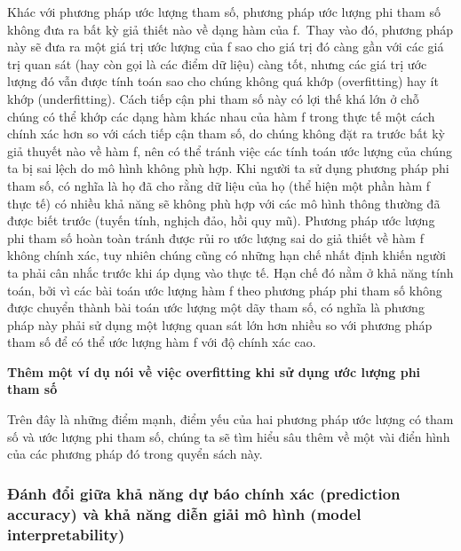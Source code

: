 \documentclass[
]{article}
\begin{document}
Khác với phương pháp ước lượng tham số, phương pháp ước lượng phi tham số không đưa ra bất kỳ giả thiết nào về dạng hàm của f.~Thay vào đó, phương pháp này sẽ đưa ra một giá trị ước lượng của f sao cho giá trị đó càng gần với các giá trị quan sát (hay còn gọi là các điểm dữ liệu) càng tốt, nhưng các giá trị ước lượng đó vẫn được tính toán sao cho chúng không quá khớp (overfitting) hay ít khớp (underfitting). Cách tiếp cận phi tham số này có lợi thế khá lớn ở chỗ chúng có thể khớp các dạng hàm khác nhau của hàm f trong thực tế một cách chính xác hơn so với cách tiếp cận tham số, do chúng không đặt ra trước bất kỳ giả thuyết nào về hàm f, nên có thể tránh việc các tính toán ước lượng của chúng ta bị sai lệch do mô hình không phù hợp. Khi người ta sử dụng phương pháp phi tham số, có nghĩa là họ đã cho rằng dữ liệu của họ (thể hiện một phần hàm f thực tế) có nhiều khả năng sẽ không phù hợp với các mô hình thông thường đã được biết trước (tuyến tính, nghịch đảo, hồi quy mũ). Phương pháp ước lượng phi tham số hoàn toàn tránh được rủi ro ước lượng sai do giả thiết về hàm f không chính xác, tuy nhiên chúng cũng có những hạn chế nhất định khiến người ta phải cân nhắc trước khi áp dụng vào thực tế. Hạn chế đó nằm ở khả năng tính toán, bởi vì các bài toán ước lượng hàm f theo phương pháp phi tham số không được chuyển thành bài toán ước lượng một dãy tham số, có nghĩa là phương pháp này phải sử dụng một lượng quan sát lớn hơn nhiều so với phương pháp tham số để có thể ước lượng hàm f với độ chính xác cao.

\textbf{Thêm một ví dụ nói về việc overfitting khi sử dụng ước lượng phi tham số}

Trên đây là những điểm mạnh, điểm yếu của hai phương pháp ước lượng có tham số và ước lượng phi tham số, chúng ta sẽ tìm hiểu sâu thêm về một vài điển hình của các phương pháp đó trong quyển sách này.

\hypertarget{ux111uxe1nh-ux111ux1ed5i-giux1eefa-khux1ea3-nux103ng-dux1ef1-buxe1o-chuxednh-xuxe1c-prediction-accuracy-vuxe0-khux1ea3-nux103ng-diux1ec5n-giux1ea3i-muxf4-huxecnh-model-interpretability}{%
\subsubsection{Đánh đổi giữa khả năng dự báo chính xác (prediction accuracy) và khả năng diễn giải mô hình (model interpretability)}\label{ux111uxe1nh-ux111ux1ed5i-giux1eefa-khux1ea3-nux103ng-dux1ef1-buxe1o-chuxednh-xuxe1c-prediction-accuracy-vuxe0-khux1ea3-nux103ng-diux1ec5n-giux1ea3i-muxf4-huxecnh-model-interpretability}}
\end{document}

